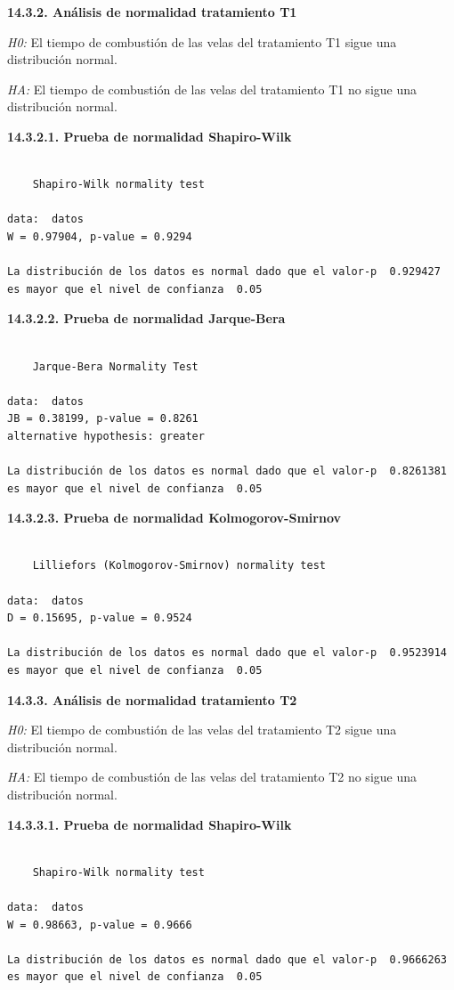 \documentclass[
  letterpaper,
  DIV=11,
  numbers=noendperiod]{scrartcl}
\begin{document}
\textbf{14.3.2. Análisis de normalidad tratamiento T1}

\emph{H0:} El tiempo de combustión de las velas del tratamiento T1 sigue
una distribución normal.

\emph{HA:} El tiempo de combustión de las velas del tratamiento T1 no
sigue una distribución normal.

\textbf{14.3.2.1. Prueba de normalidad Shapiro-Wilk}

\begin{verbatim}

    Shapiro-Wilk normality test

data:  datos
W = 0.97904, p-value = 0.9294

La distribución de los datos es normal dado que el valor-p  0.929427  es mayor que el nivel de confianza  0.05
\end{verbatim}

\textbf{14.3.2.2. Prueba de normalidad Jarque-Bera}

\begin{verbatim}

    Jarque-Bera Normality Test

data:  datos
JB = 0.38199, p-value = 0.8261
alternative hypothesis: greater

La distribución de los datos es normal dado que el valor-p  0.8261381  es mayor que el nivel de confianza  0.05
\end{verbatim}

\textbf{14.3.2.3. Prueba de normalidad Kolmogorov-Smirnov}

\begin{verbatim}

    Lilliefors (Kolmogorov-Smirnov) normality test

data:  datos
D = 0.15695, p-value = 0.9524

La distribución de los datos es normal dado que el valor-p  0.9523914  es mayor que el nivel de confianza  0.05
\end{verbatim}

\textbf{14.3.3. Análisis de normalidad tratamiento T2}

\emph{H0:} El tiempo de combustión de las velas del tratamiento T2 sigue
una distribución normal.

\emph{HA:} El tiempo de combustión de las velas del tratamiento T2 no
sigue una distribución normal.

\textbf{14.3.3.1. Prueba de normalidad Shapiro-Wilk}

\begin{verbatim}

    Shapiro-Wilk normality test

data:  datos
W = 0.98663, p-value = 0.9666

La distribución de los datos es normal dado que el valor-p  0.9666263  es mayor que el nivel de confianza  0.05
\end{verbatim}
\end{document}
